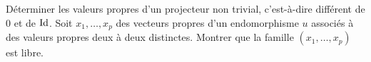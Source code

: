 \documentclass{magnolia}
\begin{document}

\begin{exos}
\exo Déterminer les valeurs propres d'un projecteur non trivial, c'est-à-dire
  différent de $0$ et de $\operatorname{Id}$.
\exo Soit $x_1,\ldots,x_p$ des vecteurs propres d'un endomorphisme $u$
  associés à des valeurs propres deux à deux distinctes. Montrer que la
  famille $(x_1,\ldots,x_p)$ est libre.
\end{exos}
\end{document}
